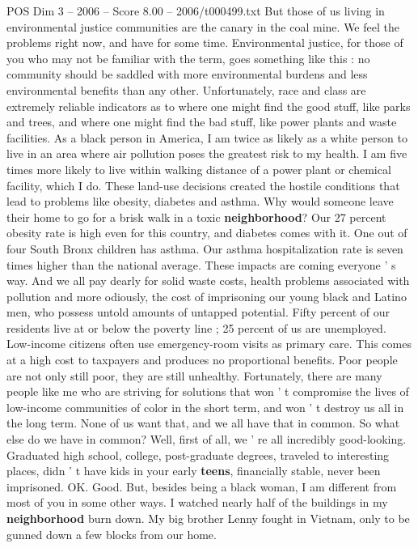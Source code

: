 \begin{textsample}{POS Dim 3 – 2006 – Score 8.00 – 2006/t000499.txt}
But those of us living in environmental justice communities are the canary in the coal mine.
We feel the problems right now, and have for some time.
Environmental justice, for those of you who may not be familiar with the term, goes something like this : no community should be saddled with more environmental burdens and less environmental benefits than any other.
Unfortunately, race and class are extremely reliable indicators as to where one might find the good stuff, like parks and trees, and where one might find the bad stuff, like power plants and waste facilities.
As a black person in America, I am twice as likely as a white person to live in an area where air pollution poses the greatest risk to my health.
I am five times more likely to live within walking distance of a power plant or chemical facility, which I do.
These land-use decisions created the hostile conditions that lead to problems like obesity, diabetes and asthma.
Why would someone leave their home to go for a brisk walk in a toxic \textbf{neighborhood}?
Our 27 percent obesity rate is high even for this country, and diabetes comes with it.
One out of four South Bronx children has asthma.
Our asthma hospitalization rate is seven times higher than the national average.
These impacts are coming everyone ' s way.
And we all pay dearly for solid waste costs, health problems associated with pollution and more odiously, the cost of imprisoning our young black and Latino men, who possess untold amounts of untapped potential.
Fifty percent of our residents live at or below the poverty line ; 25 percent of us are unemployed.
Low-income citizens often use emergency-room visits as primary care.
This comes at a high cost to taxpayers and produces no proportional benefits.
Poor people are not only still poor, they are still unhealthy.
Fortunately, there are many people like me who are striving for solutions that won ' t compromise the lives of low-income communities of color in the short term, and won ' t destroy us all in the long term.
None of us want that, and we all have that in common.
So what else do we have in common?
Well, first of all, we ' re all incredibly good-looking.
Graduated high school, college, post-graduate degrees, traveled to interesting places, didn ' t have kids in your early \textbf{teens}, financially stable, never been imprisoned.
OK.
Good.
But, besides being a black woman, I am different from most of you in some other ways.
I watched nearly half of the buildings in my \textbf{neighborhood} burn down.
My big brother Lenny fought in Vietnam, only to be gunned down a few blocks from our home.

\end{textsample}
